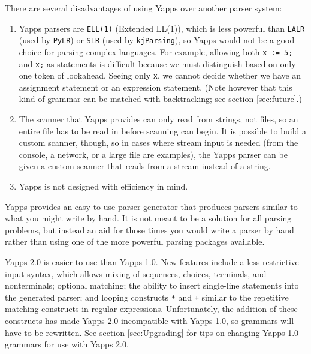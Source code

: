 \documentclass[10pt]{article}
\begin{document}
There are several disadvantages of using Yapps over another parser system:

\begin{enumerate}
   
 \item Yapps parsers are \texttt{ELL(1)} (Extended LL(1)), which is
   less powerful than \texttt{LALR} (used by \texttt{PyLR}) or
   \texttt{SLR} (used by \texttt{kjParsing}), so Yapps would not be a
   good choice for parsing complex languages.  For example, allowing
   both \texttt{x := 5;} and \texttt{x;} as statements is difficult
   because we must distinguish based on only one token of lookahead.
   Seeing only \texttt{x}, we cannot decide whether we have an
   assignment statement or an expression statement.  (Note however
   that this kind of grammar can be matched with backtracking; see
   section \ref{sec:future}.)

 \item The scanner that Yapps provides can only read from strings, not
   files, so an entire file has to be read in before scanning can
   begin.  It is possible to build a custom scanner, though, so in
   cases where stream input is needed (from the console, a network, or
   a large file are examples), the Yapps parser can be given a custom
   scanner that reads from a stream instead of a string.
   
 \item Yapps is not designed with efficiency in mind.

\end{enumerate}

Yapps provides an easy to use parser generator that produces parsers
similar to what you might write by hand.  It is not meant to be a
solution for all parsing problems, but instead an aid for those times
you would write a parser by hand rather than using one of the more
powerful parsing packages available.

Yapps 2.0 is easier to use than Yapps 1.0.  New features include a
less restrictive input syntax, which allows mixing of sequences,
choices, terminals, and nonterminals; optional matching; the ability
to insert single-line statements into the generated parser; and
looping constructs \verb|*| and \verb|+| similar to the repetitive
matching constructs in regular expressions.  Unfortunately, the
addition of these constructs has made Yapps 2.0 incompatible with
Yapps 1.0, so grammars will have to be rewritten.  See section
\ref{sec:Upgrading} for tips on changing Yapps 1.0 grammars for use
with Yapps 2.0.
\end{document}
